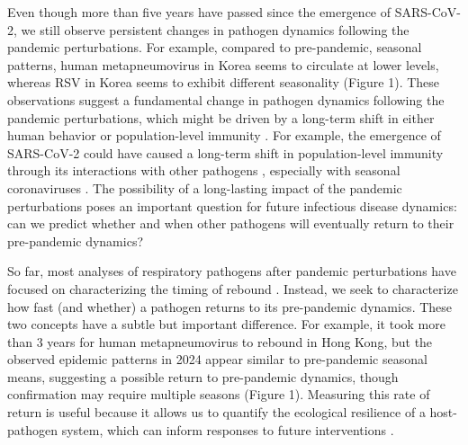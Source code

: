 \documentclass[12pt]{article}
\begin{document}
Even though more than five years have passed since the emergence of SARS-CoV-2, we still observe persistent changes in pathogen dynamics following the pandemic perturbations.
For example, compared to pre-pandemic, seasonal patterns, human metapneumovirus in Korea seems to circulate at lower levels, whereas RSV in Korea seems to exhibit different seasonality (Figure 1).
These observations suggest a fundamental change in pathogen dynamics following the pandemic perturbations, which might be driven by a long-term shift in either human behavior or population-level immunity \citep{kissler2020projecting,baker2022long}.
For example, the emergence of SARS-CoV-2 could have caused a long-term shift in population-level immunity through its interactions with other pathogens \citep{swets2022sars}, especially with seasonal coronaviruses \citep{kissler2020projecting,lin2022pre,murray2023impact}.
The possibility of a long-lasting impact of the pandemic perturbations poses an important question for future infectious disease dynamics: can we predict whether and when other pathogens will eventually return to their pre-pandemic dynamics?

So far, most analyses of respiratory pathogens after pandemic perturbations have focused on characterizing the timing of rebound \citep{baker2020impact,eden2022off,perofsky2024impacts}.
Instead, we seek to characterize how fast (and whether) a pathogen returns to its pre-pandemic dynamics.
These two concepts have a subtle but important difference. 
For example, it took more than 3 years for human metapneumovirus to rebound in Hong Kong, but the observed epidemic patterns in 2024 appear similar to pre-pandemic seasonal means, suggesting a possible return to pre-pandemic dynamics, though confirmation may require multiple seasons (Figure 1).
Measuring this rate of return is useful because it allows us to quantify the ecological resilience of a host-pathogen system, which can inform responses to future interventions \citep{pimm1979structure, neubert1997alternatives,gunderson2000ecological,dakos2022ecological}.
\end{document}
